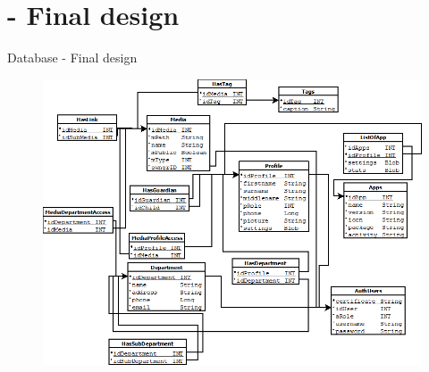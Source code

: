 \section{ - Final design}
\begin{frame}{Database - Final design}
\begin{figure}[htbp]
	\centering
		\includegraphics[width=1.00\textwidth]{Img/DiaDesign.png}
	\label{fig:DiaDesign}
\end{figure}


\end{frame}